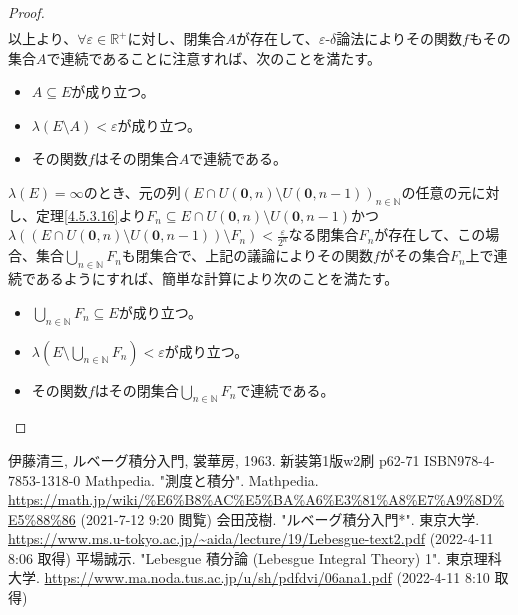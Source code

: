 \documentclass[dvipdfmx]{jsarticle}
\begin{document}
\begin{proof}
\begin{align*}
\end{align*}
以上より、$\forall\varepsilon \in \mathbb{R}^{+}$に対し、閉集合$A$が存在して、$\varepsilon $-$\delta $論法によりその関数$f$もその集合$A$で連続であることに注意すれば、次のことを満たす。
\begin{itemize}
\item
  $A \subseteq E$が成り立つ。
\item
  $\lambda(E \setminus A) < \varepsilon$が成り立つ。
\item
  その関数$f$はその閉集合$A$で連続である。
\end{itemize}\par
$\lambda(E) = \infty$のとき、元の列$\left( E \cap U\left( \mathbf{0},n \right) \setminus U\left( \mathbf{0},n - 1 \right) \right)_{n \in \mathbb{N}}$の任意の元に対し、定理\ref{4.5.3.16}より$F_{n} \subseteq E \cap U\left( \mathbf{0},n \right) \setminus U\left( \mathbf{0},n - 1 \right)$かつ$\lambda\left( \left( E \cap U\left( \mathbf{0},n \right) \setminus U\left( \mathbf{0},n - 1 \right) \right) \setminus F_{n} \right) < \frac{\varepsilon}{2^{n}}$なる閉集合$F_{n}$が存在して、この場合、集合$\bigcup_{n \in \mathbb{N}} F_{n}$も閉集合で、上記の議論によりその関数$f$がその集合$F_{n}$上で連続であるようにすれば、簡単な計算により次のことを満たす。
\begin{itemize}
\item
  $\bigcup_{n \in \mathbb{N}} F_{n} \subseteq E$が成り立つ。
\item
  $\lambda\left( E \setminus \bigcup_{n \in \mathbb{N}} F_{n} \right) < \varepsilon$が成り立つ。
\item
  その関数$f$はその閉集合$\bigcup_{n \in \mathbb{N}} F_{n}$で連続である。
\end{itemize}
\end{proof}
\begin{thebibliography}{50}
  伊藤清三, ルベーグ積分入門, 裳華房, 1963. 新装第1版w2刷 p62-71 ISBN978-4-7853-1318-0
  Mathpedia. "測度と積分". Mathpedia. \url{https://math.jp/wiki/%E6%B8%AC%E5%BA%A6%E3%81%A8%E7%A9%8D%E5%88%86} (2021-7-12 9:20 閲覧)
  会田茂樹. "ルベーグ積分入門*". 東京大学. \url{https://www.ms.u-tokyo.ac.jp/~aida/lecture/19/Lebesgue-text2.pdf} (2022-4-11 8:06 取得)
  平場誠示. "Lebesgue 積分論 (Lebesgue Integral Theory) 1". 東京理科大学. \url{https://www.ma.noda.tus.ac.jp/u/sh/pdfdvi/06ana1.pdf} (2022-4-11 8:10 取得)
\end{thebibliography}
\end{document}
